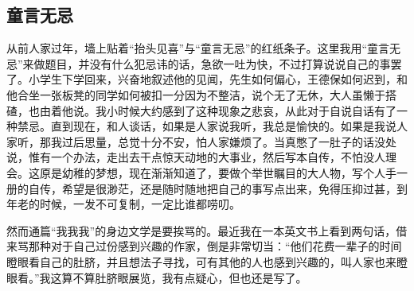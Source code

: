 \subsection{童言无忌}

\par 从前人家过年，墙上贴着“抬头见喜”与“童言无忌”的红纸条子。这里我用“童言无忌”来做题目，并没有什么犯忌讳的话，急欲一吐为快，不过打算说说自己的事罢了。小学生下学回来，兴奋地叙述他的见闻，先生如何偏心，王德保如何迟到，和他合坐一张板凳的同学如何被扣一分因为不整洁，说个无了无休，大人虽懒于搭碴，也由着他说。我小时候大约感到了这种现象之悲哀，从此对于自说自话有了一种禁忌。直到现在，和人谈话，如果是人家说我听，我总是愉快的。如果是我说人家听，那我过后思量，总觉十分不安，怕人家嫌烦了。当真憋了一肚子的话没处说，惟有一个办法，走出去干点惊天动地的大事业，然后写本自传，不怕没人理会。这原是幼稚的梦想，现在渐渐知道了，要做个举世瞩目的大人物，写个人手一册的自传，希望是很渺茫，还是随时随地把自己的事写点出来，免得压抑过甚，到年老的时候，一发不可复制，一定比谁都唠叨。
\par 然而通篇“我我我”的身边文学是要挨骂的。最近我在一本英文书上看到两句话，借来骂那种对于自己过份感到兴趣的作家，倒是非常切当：“他们花费一辈子的时间瞪眼看自己的肚脐，并且想法子寻找，可有其他的人也感到兴趣的，叫人家也来瞪眼看。”我这算不算肚脐眼展览，我有点疑心，但也还是写了。
